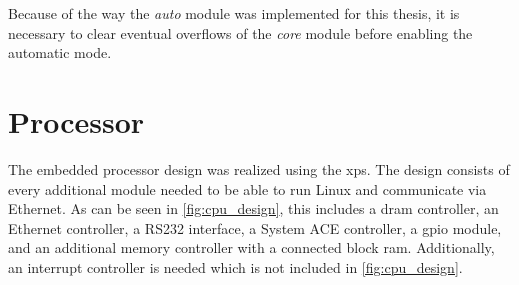\documentclass[12pt,a4paper,parskip=full,abstract=true,BCOR=12mm,twoside,open=right]{scrreprt}
\def\device#1{\mbox{\textit{#1}}}
\begin{document}
Because of the way the \device{auto} module was implemented for this thesis,
it is necessary to clear eventual overflows of the \device{core} module before
enabling the automatic mode.


\section{Processor}
\label{sec:processor}

The embedded processor design was realized using the \gls{xps}. The
design consists of every additional module needed to be
able to run Linux and communicate via Ethernet. As can be seen in
\cref{fig:cpu_design}, this includes a \gls{dram} controller, an
Ethernet controller, a RS232 interface, a System ACE controller,
a \gls{gpio} module, and an additional memory controller with a connected
block \gls{ram}. Additionally, an interrupt controller is needed which is
not included in \cref{fig:cpu_design}.
\end{document}
